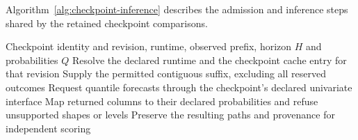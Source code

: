 Algorithm~\ref{alg:checkpoint-inference} describes the admission
and inference steps shared by the retained checkpoint comparisons.
\begin{algorithm}[htbp]
\caption{Run a declared pretrained checkpoint on a contiguous prefix and retain aligned forecast columns.}
\label{alg:checkpoint-inference}
\begin{algorithmic}[1]
\Require Checkpoint identity and revision, runtime, observed prefix, horizon $H$ and probabilities $Q$
\State Resolve the declared runtime and the checkpoint cache entry for that revision
\State Supply the permitted contiguous suffix, excluding all reserved outcomes
\State Request quantile forecasts through the checkpoint's declared univariate interface
\State Map returned columns to their declared probabilities and refuse unsupported shapes or levels
\State Preserve the resulting paths and provenance for independent scoring
\end{algorithmic}
\end{algorithm}
